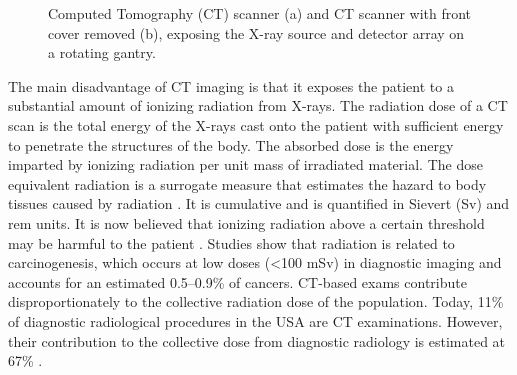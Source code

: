 \begin{figure}[t]
  \centering
  \hfill
  \caption{\small{Computed Tomography (CT) scanner (a) and CT scanner with front cover removed (b), exposing the X-ray source and detector array on a rotating gantry.}}
    \label{fig:figures/CT_machine}
\end{figure}

The main disadvantage of CT imaging is that it exposes the patient to a substantial amount of ionizing radiation from X-rays. The radiation dose of a CT scan is the total energy of the X-rays cast onto the patient with sufficient energy to penetrate the structures of the body. The absorbed dose is the energy imparted by ionizing radiation per unit mass of irradiated material. The dose equivalent radiation is a surrogate measure that estimates the hazard to body tissues caused by radiation \cite{mettler2000ct, goo2017dual}. It is cumulative and is quantified in Sievert (Sv) and rem units.
It is now believed that ionizing radiation above a certain threshold may be harmful to the patient \cite{hall2008cancer, davies2011risks, kalra2004strategies}. Studies show that radiation is related to carcinogenesis, which occurs at low doses (\textless 100 mSv) in diagnostic imaging and accounts for an estimated 0.5--0.9\% of cancers. CT-based exams contribute disproportionately to the collective radiation dose of the population. Today, 11\% of diagnostic radiological procedures in the USA are CT examinations. However, their contribution to the collective dose from diagnostic radiology is estimated at 67\% \cite{mettler2000ct}.

